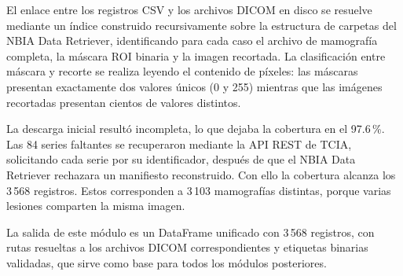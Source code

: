 El enlace entre los registros CSV y los archivos DICOM
en disco se resuelve mediante un índice construido
recursivamente sobre la estructura de carpetas del
NBIA Data Retriever, identificando para cada caso el
archivo de mamografía completa, la máscara ROI binaria
y la imagen recortada. La clasificación entre máscara
y recorte se realiza leyendo el contenido de píxeles:
las máscaras presentan exactamente dos valores únicos
(0 y 255) mientras que las imágenes recortadas presentan
cientos de valores distintos.

La descarga inicial resultó incompleta, lo que dejaba la cobertura en el 97.6\,\%.
Las 84 series faltantes se recuperaron mediante la API REST de TCIA, solicitando
cada serie por su identificador, después de que el NBIA Data Retriever rechazara
un manifiesto reconstruido. Con ello la cobertura alcanza los 3\,568 registros.
Estos corresponden a 3\,103 mamografías distintas, porque varias lesiones
comparten la misma imagen.

La salida de este módulo es un DataFrame unificado con
3\,568 registros, con rutas resueltas a los archivos DICOM
correspondientes y etiquetas binarias validadas, que sirve
como base para todos los módulos posteriores.
